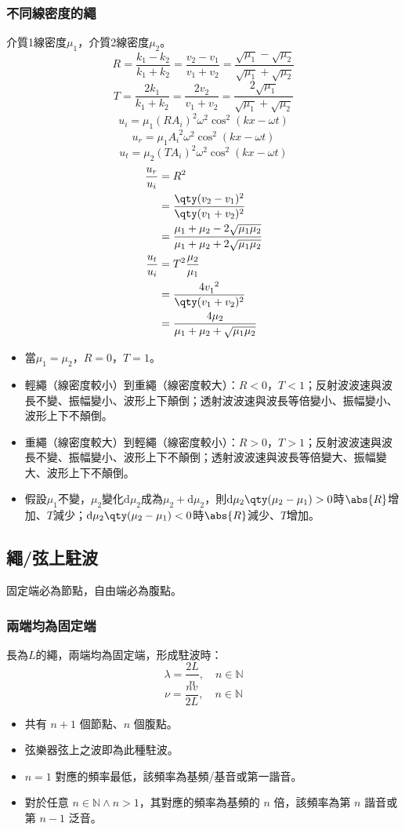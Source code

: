 \documentclass[a4paper,12pt]{report}
\begin{document}
\subsubsection{不同線密度的繩}
介質1線密度$\mu_1$，介質2線密度$\mu_2$。
\[ R = \frac{k_1-k_2}{k_1+k_2} = \frac{v_2-v_1}{v_1+v_2} = \frac{\sqrt{\mu_1}-\sqrt{\mu_2}}{\sqrt{\mu_1}+\sqrt{\mu_2}} \]
\[ T = \frac{2k_1}{k_1+k_2} = \frac{2v_2}{v_1+v_2} = \frac{2\sqrt{\mu_1}}{\sqrt{\mu_1}+\sqrt{\mu_2}} \]
\[ u_i = \mu_1 (R A_i)^2 \omega^2 \cos^2(kx - \omega t) \]
\[ u_r = \mu_1 A_i^{\phantom{i}2} \omega^2 \cos^2(kx - \omega t) \]
\[ u_t = \mu_2 (T A_i)^2 \omega^2 \cos^2(kx - \omega t) \]
\[\begin{aligned}
\frac{u_r}{u_i} &= R^2 \\
&= \frac{\qty(v_2-v_1)^2}{\qty(v_1+v_2)^2} \\
&= \frac{\mu_1+\mu_2-2\sqrt{\mu_1\mu_2}}{\mu_1+\mu_2+2\sqrt{\mu_1\mu_2}}\\
\frac{u_t}{u_i} &= T^2\frac{\mu_2}{\mu_1} \\
&= \frac{4v_1^{\phantom{1}2}}{\qty(v_1+v_2)^2} \\
&= \frac{4\mu_2}{\mu_1+\mu_2+\sqrt{\mu_1\mu_2}}
\end{aligned}\]
\begin{itemize}
\item 當$\mu_1=\mu_2$，$R=0$，$T=1$。
\item 輕繩（線密度較小）到重繩（線密度較大）：$R<0$，$T<1$；反射波波速與波長不變、振幅變小、波形上下顛倒；透射波波速與波長等倍變小、振幅變小、波形上下不顛倒。
\item 重繩（線密度較大）到輕繩（線密度較小）：$R>0$，$T>1$；反射波波速與波長不變、振幅變小、波形上下不顛倒；透射波波速與波長等倍變大、振幅變大、波形上下不顛倒。
\item 假設$\mu_1$不變，$\mu_2$變化$\mathrm{d}\mu_2$成為$\mu_2+\mathrm{d}\mu_2$，則$\mathrm{d}\mu_2\qty(\mu_2-\mu_1)>0$時$\abs{R}$增加、$T$減少；$\mathrm{d}\mu_2\qty(\mu_2-\mu_1)<0$時$\abs{R}$減少、$T$增加。
\end{itemize}
\subsection{繩/弦上駐波}
固定端必為節點，自由端必為腹點。
\subsubsection{兩端均為固定端}
長為$L$的繩，兩端均為固定端，形成駐波時：
\[\lambda = \frac{2L}{n},\quad n\in\mathbb{N} \]
\[\nu = \frac{nv}{2L},\quad n\in\mathbb{N} \]
\begin{itemize}
\item 共有 $n+1$ 個節點、$n$ 個腹點。
\item 弦樂器弦上之波即為此種駐波。
\item $n=1$ 對應的頻率最低，該頻率為基頻/基音或第一諧音。
\item 對於任意 $n\in\mathbb{N}\land n>1$，其對應的頻率為基頻的 $n$ 倍，該頻率為第 $n$ 諧音或第 $n-1$ 泛音。
\end{itemize}
\end{document}
